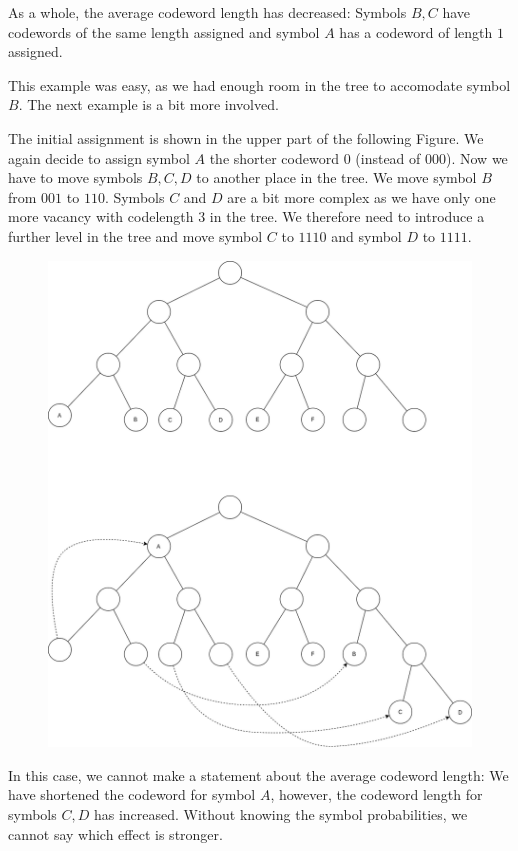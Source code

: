 As a whole, the average codeword length has decreased: Symbols $B, C$ have codewords of the same length assigned and symbol $A$ has a codeword of length $1$ assigned.

This example was easy, as we had enough room in the tree to accomodate symbol $B$. The next example is a bit more involved.

The initial assignment is shown in the upper part of the following Figure. We again decide to assign symbol $A$ the shorter codeword $0$ (instead of $000$). Now we have to move symbols $B, C, D$ to another place in the tree. We move symbol $B$ from $001$ to $110$. Symbols $C$ and $D$ are a bit more complex as we have only one more vacancy with codelength $3$ in the tree. We therefore need to introduce a further level in the tree and move symbol $C$ to $1110$ and symbol $D$ to $1111$.

\begin{figure}[H]
    \centering
    \includegraphics[scale=0.4]{images/2021-04-26-scenario_2.png}
\end{figure}

In this case, we cannot make a statement about the average codeword length: We have shortened the codeword for symbol $A$, however, the codeword length for symbols $C, D$ has increased. Without knowing the symbol probabilities, we cannot say which effect is stronger.

